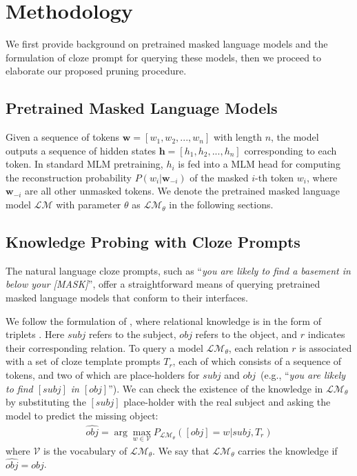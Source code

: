 \section{Methodology}
We first provide background on pretrained masked language models and the formulation of cloze prompt for querying these models, then we proceed to 
elaborate our proposed pruning procedure.
\subsection{Pretrained Masked Language Models}
\label{sec:PLMs}
Given a sequence of tokens $\bm{w}=[w_1, w_2, ..., w_n]$ with length $n$, the model outputs a sequence of hidden states $\bm{h}=[h_1, h_2, ..., h_n]$ corresponding to each token. In standard MLM pretraining, $h_{i}$ is fed into a  MLM head for computing the reconstruction probability $P(w_{i}|\bm{w}_{-i})$ of the masked $i$-th token $w_{i}$, where 
$\bm{w}_{-i}$ are all other unmasked tokens. We denote the pretrained masked language model 
$\mathcal{LM}$ with parameter $\theta$ as $\mathcal{LM}_{\theta}$ in the following sections.
\subsection{Knowledge Probing with Cloze Prompts}
The natural language cloze prompts, such as ``\textit{you are likely to find a basement in below your [MASK]}'', 
offer a straightforward means of querying pretrained masked language 
models that conform to their interfaces.

We follow the formulation of \citet{Petroni2020}, where relational knowledge is in the form of triplets . 
Here $subj$ refers to the subject, $obj$ refers to the object, 
and $r$ indicates their corresponding relation. To query a model 
$\mathcal{LM}_{\theta}$, each relation $r$ is associated with a set of 
cloze template prompts $T_r$, each of which consists of a sequence of 
tokens, and two of which are place-holders for $subj$ and $obj$~(e.g., ``\textit{you are likely to find $[subj]$ in $[obj]$}''). We can
check the existence of the knowledge in $\mathcal{LM}_\theta$ by 
substituting the $[subj]$ place-holder with the 
real subject and asking the model to predict the missing object:
\begin{align}\nonumber
\hat{obj}=\arg \max_{w\in \mathcal{V}}P_{\mathcal{LM}_\theta}([obj]=w|subj, T_r)
\end{align}
where $\mathcal{V}$ is the vocabulary of $\mathcal{LM}_\theta$. We say that $\mathcal{LM}_\theta$ 
carries the knowledge if $\hat{obj}=obj$.

